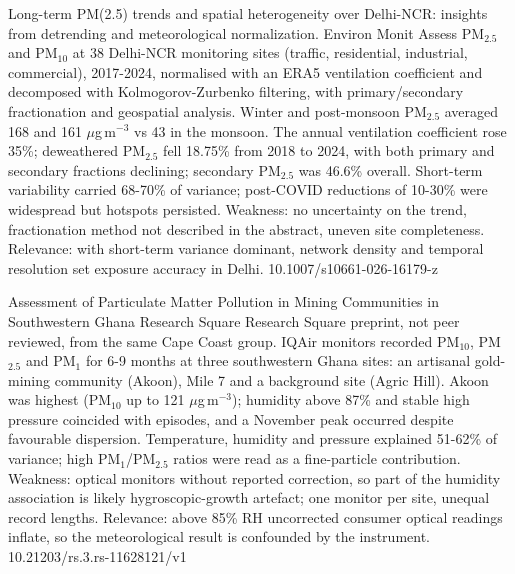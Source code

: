 \documentclass[10pt]{article}
\begin{document}
{Long-term PM(2.5) trends and spatial heterogeneity over Delhi-NCR: insights from detrending and meteorological normalization.}
{Environ Monit Assess}
{PM$_{2.5}$ and PM$_{10}$ at 38 Delhi-NCR monitoring sites (traffic, residential, industrial, commercial), 2017-2024, normalised with an ERA5 ventilation coefficient and decomposed with Kolmogorov-Zurbenko filtering, with primary/secondary fractionation and geospatial analysis. Winter and post-monsoon PM$_{2.5}$ averaged 168 and 161 $\mu$g\,m$^{-3}$ vs 43 in the monsoon. The annual ventilation coefficient rose 35\%; deweathered PM$_{2.5}$ fell 18.75\% from 2018 to 2024, with both primary and secondary fractions declining; secondary PM$_{2.5}$ was 46.6\% overall. Short-term variability carried 68-70\% of variance; post-COVID reductions of 10-30\% were widespread but hotspots persisted. Weakness: no uncertainty on the trend, fractionation method not described in the abstract, uneven site completeness. Relevance: with short-term variance dominant, network density and temporal resolution set exposure accuracy in Delhi.}
{10.1007/s10661-026-16179-z}

{Assessment of Particulate Matter Pollution in Mining Communities in Southwestern Ghana}
{Research Square}
{Research Square preprint, not peer reviewed, from the same Cape Coast group. IQAir monitors recorded PM$_{10}$, PM$_{2.5}$ and PM$_{1}$ for 6-9 months at three southwestern Ghana sites: an artisanal gold-mining community (Akoon), Mile 7 and a background site (Agric Hill). Akoon was highest (PM$_{10}$ up to 121 $\mu$g\,m$^{-3}$); humidity above 87\% and stable high pressure coincided with episodes, and a November peak occurred despite favourable dispersion. Temperature, humidity and pressure explained 51-62\% of variance; high PM$_{1}$/PM$_{2.5}$ ratios were read as a fine-particle contribution. Weakness: optical monitors without reported correction, so part of the humidity association is likely hygroscopic-growth artefact; one monitor per site, unequal record lengths. Relevance: above 85\% RH uncorrected consumer optical readings inflate, so the meteorological result is confounded by the instrument.}
{10.21203/rs.3.rs-11628121/v1}
\end{document}
